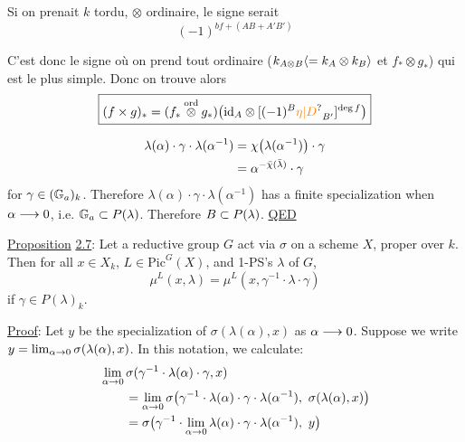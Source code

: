 Si on prenait $k$ tordu, $\otimes$ ordinaire, le signe serait
\[
(-1)^{bf+(AB+A'B')}
\]

C'est donc le signe où on prend tout ordinaire ($k_{A\otimes B}\inserted{=k_A\otimes k_B}$ et $f_*\otimes g_*$) qui est le plus simple. Donc on trouve alors
\[
\boxed{(f\times g)_*=(f_*\overset{\mathrm{ord}}{\otimes}g_*)\bigl(\mathrm{id}_A\otimes[(-1)^B\unsure{\eta|D}_{B'}]^{\deg f}\bigr)}
\]


\[
\begin{aligned}
\lambda(\alpha)\cdot\gamma\cdot\lambda(\alpha^{-1})
 &=\chi\bigl(\lambda(\alpha^{-1})\bigr)\cdot\gamma\\
 &=\alpha^{-\bar{\chi}(\bar{\lambda})}\cdot\gamma
\end{aligned}
\]
for $\gamma\in(\mathbb G_a)_k$. Therefore $\lambda(\alpha)\cdot\gamma\cdot\lambda(\alpha^{-1})$ has a finite specialization when $\alpha\longrightarrow0$, i.e. $\mathbb G_a\subset P(\lambda)$. Therefore $B\subset P(\lambda)$. \uline{QED}

\uline{Proposition} \uline{2.7}: Let a reductive group $G$ act via $\sigma$ on a scheme $X$, proper over $k$. Then for all $x\in X_k$, $L\in\mathrm{Pic}^{G}(X)$, and 1-PS's $\lambda$ of $G$,
\[
\mu^{L}(x,\lambda)=\mu^{L}(x,\gamma^{-1}\cdot\lambda\cdot\gamma)
\]
if $\gamma\in P(\lambda)_k$.

\uline{Proof}: Let $y$ be the specialization of $\sigma(\lambda(\alpha),x)$ as $\alpha\longrightarrow0$. Suppose we write $y=\lim_{\alpha\to 0}\sigma(\lambda(\alpha),x)$. In this notation, we calculate:
\[
\begin{aligned}
&\lim_{\handwritten{\alpha\to 0}}\sigma(\gamma^{-1}\cdot\lambda(\alpha)\cdot\gamma,x)\\
&\qquad=\lim_{\handwritten{\alpha\to 0}}\sigma\handwritten{\bigl(}\gamma^{-1}\cdot\lambda(\alpha)\cdot\gamma\cdot\lambda(\alpha^{-1}),\ \sigma(\lambda(\alpha),x)\handwritten{\bigr)}\\
&\qquad=\sigma\handwritten{\bigl(}\gamma^{-1}\cdot\lim_{\handwritten{\alpha\to 0}}\lambda(\alpha)\cdot\gamma\cdot\lambda(\alpha^{-1}),\ y\handwritten{\bigr)}
\end{aligned}
\]

